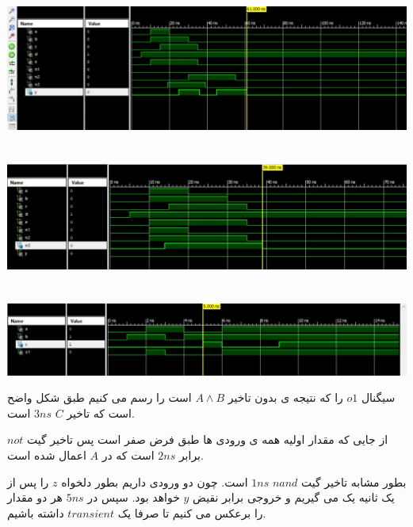 \documentclass[a4paper]{article}
\begin{document}
\begin{center}
\includegraphics[width=15cm]{images/1_b.jpg}
\end{center}

\newpage
\section{}

\begin{center}
\includegraphics[width=15cm]{images/part2.jpg}
\end{center}

\section{}
\begin{center}
\includegraphics[width=15cm]{images/3_c.jpg}
\end{center}

سیگنال $o1$ را که نتیجه ی بدون تاخیر $ A\land B$ است را رسم می کنیم طبق شکل واضح است که تاخیر $C$ $3ns$ است.

از جایی که مقدار اولیه همه ی ورودی ها طبق فرض صفر است پس تاخیر گیت $not$ برابر $2ns$ است که در $A$ اعمال شده است.

بطور مشابه تاخیر گیت $nand$ $1ns$ است. چون دو ورودی داریم بطور دلخواه $z$ را پس از یک ثانیه یک می گیریم و خروجی برابر نقیض $y$ خواهد بود. سپس در $5ns$ هر دو مقدار را برعکس می کنیم تا صرفا یک $transient$ داشته باشیم.
\end{document}

